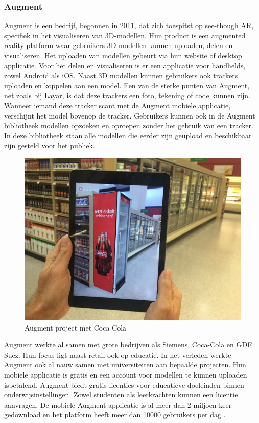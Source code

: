 \documentclass[pdftex,a4paper,12pt,twoside]{report}
\begin{document}
\subsubsection{Augment}
Augment is een bedrijf, begonnen in 2011, dat zich toespitst op see-though AR, specifiek in het visualiseren van 3D-modellen. Hun product is een augmented reality platform waar gebruikers 3D-modellen kunnen uploaden, delen en visualiseren. Het uploaden van modellen gebeurt via hun website of desktop applicatie. Voor het delen en visualiseren is er een applicatie voor handhelds, zowel Android als iOS. Naast 3D modellen kunnen gebruikers ook trackers uploaden en koppelen aan een model. Een van de sterke punten van Augment, net zoals bij Layar, is dat deze trackers een foto, tekening of code kunnen zijn. Wanneer iemand deze tracker scant met de Augment mobiele applicatie, verschijnt het model bovenop de tracker. Gebruikers kunnen ook in de Augment bibliotheek modellen opzoeken en oproepen zonder het gebruik van een tracker. In deze bibliotheek staan alle modellen die eerder zijn ge\"upload en beschikbaar zijn gesteld voor het publiek. \\

\begin{figure}
\vspace{-15pt}
\includegraphics[scale=0.045]{augmentFoto.jpg}
\caption{Augment project met Coca Cola \citep{augmentFoto}}
\vspace{-15pt}
\end{figure}

Augment werkte al samen met grote bedrijven als Siemens, Coca-Cola en GDF Suez.  Hun focus ligt naast retail ook op educatie. In het verleden werkte Augment ook al nauw samen met universiteiten aan bepaalde projecten. Hun mobiele applicatie is gratis en een account voor modellen te kunnen uploaden isbetalend. Augment biedt gratis licenties voor educatieve doeleinden binnen onderwijsinstellingen. Zowel studenten als leerkrachten kunnen een licentie aanvragen. De mobiele Augment applicatie is al meer dan 2 miljoen keer gedownload en het platform heeft meer dan 10000 gebruikers per dag \citep{augmentData}.
\end{document}
